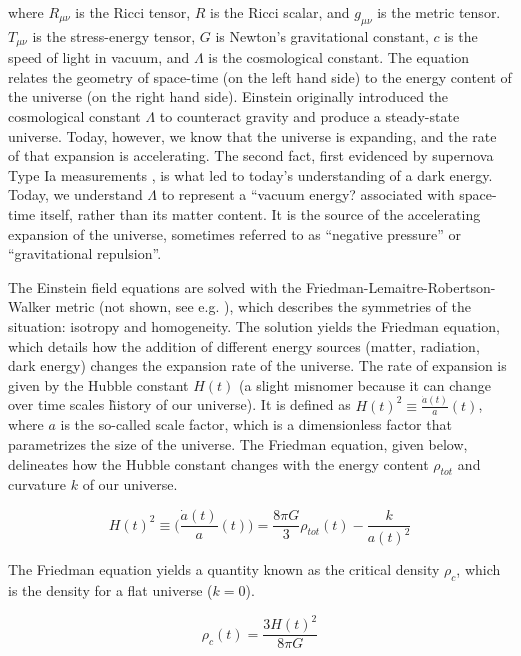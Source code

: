 where $R_{\mu \nu}$ is the Ricci tensor, $R$ is the Ricci scalar, and $g_{\mu\nu}$ is the metric tensor. $T_{\mu \nu}$ is the stress-energy tensor, $G$ is Newton's gravitational constant, $c$ is the speed of light in vacuum, and $\Lambda$ is the cosmological constant. The equation relates the geometry of space-time (on the left hand side) to the energy content of the universe (on the right hand side). Einstein originally introduced the cosmological constant $\Lambda$ to counteract gravity and produce a steady-state universe. Today, however, we know that the universe is expanding, and the rate of that expansion is accelerating. The second fact, first evidenced by supernova Type Ia measurements \cite{Riess1998} \cite{Perlmutter1998}, is what led to today's understanding of a dark energy. Today, we understand  $\Lambda$ to represent a ``vacuum energy? associated with space-time itself, rather than its matter content. It is the source of the accelerating expansion of the universe, sometimes referred to as ``negative pressure'' or ``gravitational repulsion''. 

The Einstein field equations are solved with the Friedman-Lemaitre-Robertson-Walker metric (not shown, see e.g. \cite{Ryden1999}), which describes the symmetries of the situation: isotropy and homogeneity. The solution yields the Friedman equation, which details how the addition of different energy sources (matter, radiation, dark energy) changes the expansion rate of the universe. The rate of expansion is given by the Hubble constant $H(t)$ (a slight misnomer because it can change over time scales \~ history of our universe). It is defined as $H(t)^{2} \equiv \frac{\dot{a}(t)}{a}(t)$, where $a$ is the so-called scale factor, which is a dimensionless factor that parametrizes the size of the universe. The Friedman equation, given below, delineates how the Hubble constant changes with the energy content $\rho_{tot}$ and curvature $k$ of our universe.

\begin{equation}
H(t)^{2} \equiv \Big( \frac{\dot{a}(t)}{a}(t) \Big) = \frac{8 \pi G}{3} \rho_{tot}(t) - \frac{k}{a(t)^{2}}
\end{equation}

The Friedman equation yields a quantity known as the critical density $\rho_{c}$, which is the density for a flat universe ($k=0$). 

\begin{equation}
\rho_{c}(t) = \frac{ 3 H(t)^{2}}{8 \pi G} 
\end{equation}

